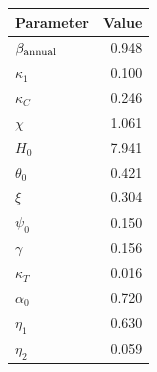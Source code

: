 \begin{tabular}{@{}lr@{}}
\toprule
Parameter & Value \\
\midrule
$\beta_{\rm annual}$ & 0.948 \\ %
$\kappa_1$ & 0.100 \\ %
$\kappa_C$ & 0.246 \\ %
$\chi$ & 1.061 \\ %
$H_0$ & 7.941 \\ %
$\theta_0$ & 0.421 \\ %
$\xi$ & 0.304 \\ %
$\psi_0$ & 0.150 \\ %
$\gamma$ & 0.156 \\ %
$\kappa_T$ & 0.016 \\ %
$\alpha_0$ & 0.720 \\ %
$\eta_1$ & 0.630 \\ %
$\eta_2$ & 0.059 \\ %
\bottomrule
\end{tabular}
